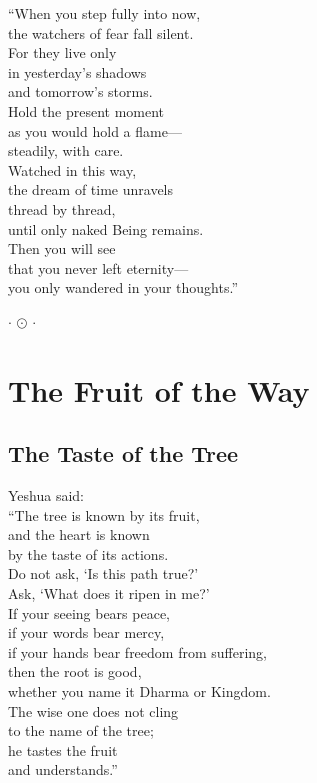 \documentclass[10pt, openright]{book}
\newcommand{\sectionbreak}{\filbreak}
\newcommand{\ornament}{
    \vspace{1.5cm}
    \begin{center}
        \large \(\cdot\) \(\odot\) \(\cdot\)
    \end{center}
    \vspace{1.5cm}
}
\begin{document}
``When you step fully into now,\\
the watchers of fear fall silent.\\
For they live only\\
in yesterday's shadows\\
and tomorrow's storms.\\
Hold the present moment\\
as you would hold a flame---\\
steadily, with care.\\
Watched in this way,\\
the dream of time unravels\\
thread by thread,\\
until only naked Being remains.\\
Then you will see\\
that you never left eternity---\\
you only wandered in your thoughts.''

\ornament

\chapter{The Fruit of the Way}\label{the-fruit-of-the-way}

\sectionbreak

\section{The Taste of the Tree}\label{the-taste-of-the-tree}

Yeshua said:\\
``The tree is known by its fruit,\\
and the heart is known\\
by the taste of its actions.\\
Do not ask, `Is this path true?'\\
Ask, `What does it ripen in me?'\\
If your seeing bears peace,\\
if your words bear mercy,\\
if your hands bear freedom from suffering,\\
then the root is good,\\
whether you name it Dharma or Kingdom.\\
The wise one does not cling\\
to the name of the tree;\\
he tastes the fruit\\
and understands.''
\end{document}
